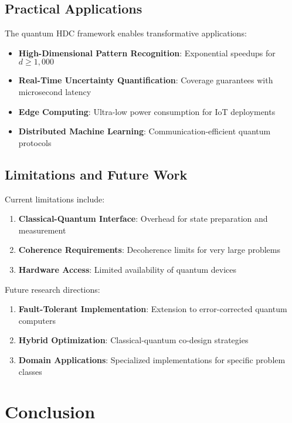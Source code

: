 \documentclass[10pt,twocolumn,letterpaper]{article}
\begin{document}
\subsection{Practical Applications}

The quantum HDC framework enables transformative applications:

\begin{itemize}
\item \textbf{High-Dimensional Pattern Recognition}: Exponential speedups for $d \geq 1,000$
\item \textbf{Real-Time Uncertainty Quantification}: Coverage guarantees with microsecond latency
\item \textbf{Edge Computing}: Ultra-low power consumption for IoT deployments
\item \textbf{Distributed Machine Learning}: Communication-efficient quantum protocols
\end{itemize}

\subsection{Limitations and Future Work}

Current limitations include:

\begin{enumerate}
\item \textbf{Classical-Quantum Interface}: Overhead for state preparation and measurement
\item \textbf{Coherence Requirements}: Decoherence limits for very large problems
\item \textbf{Hardware Access}: Limited availability of quantum devices
\end{enumerate}

Future research directions:
\begin{enumerate}
\item \textbf{Fault-Tolerant Implementation}: Extension to error-corrected quantum computers
\item \textbf{Hybrid Optimization}: Classical-quantum co-design strategies
\item \textbf{Domain Applications}: Specialized implementations for specific problem classes
\end{enumerate}

\section{Conclusion}
\end{document}
